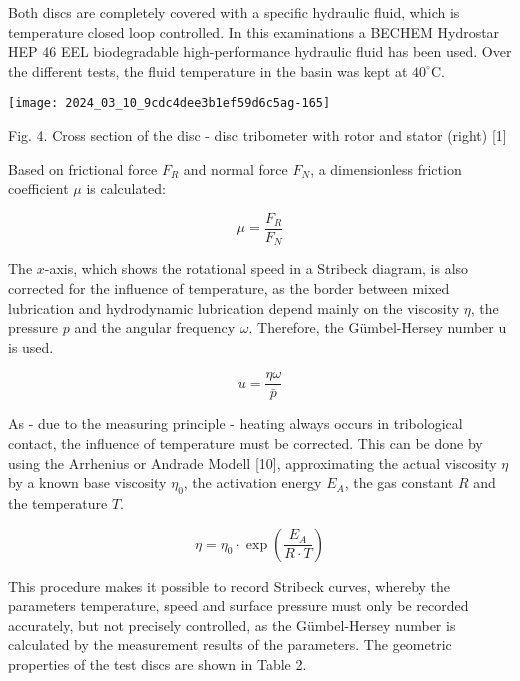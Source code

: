 \documentclass[10pt]{article}
\begin{document}
Both discs are completely covered with a specific hydraulic fluid, which is temperature closed loop controlled. In this examinations a BECHEM Hydrostar HEP 46 EEL biodegradable high-performance hydraulic fluid has been used. Over the different tests, the fluid temperature in the basin was kept at $40^{\circ} \mathrm{C}$.

\begin{center}
\texttt{[image: 2024\_03\_10\_9cdc4dee3b1ef59d6c5ag-165]}
\end{center}

Fig. 4. Cross section of the disc - disc tribometer with rotor and stator (right) [1]

Based on frictional force $F_{R}$ and normal force $F_{N}$, a dimensionless friction coefficient $\mu$ is calculated:


\begin{equation*}
\mu=\frac{F_{R}}{F_{N}} \tag{1}
\end{equation*}


The $x$-axis, which shows the rotational speed in a Stribeck diagram, is also corrected for the influence of temperature, as the border between mixed lubrication and hydrodynamic lubrication depend mainly on the viscosity $\eta$, the pressure $p$ and the angular frequency $\omega$. Therefore, the Gümbel-Hersey number $\mathrm{u}$ is used.


\begin{equation*}
u=\frac{\eta \omega}{\bar{p}} \tag{2}
\end{equation*}


As - due to the measuring principle - heating always occurs in tribological contact, the influence of temperature must be corrected. This can be done by using the Arrhenius or Andrade Modell [10], approximating the actual viscosity $\eta$ by a known base viscosity $\eta_{0}$, the activation energy $E_{A}$, the gas constant $R$ and the temperature $T$.


\begin{equation*}
\eta=\eta_{0} \cdot \exp \left(\frac{E_{A}}{R \cdot T}\right) \tag{3}
\end{equation*}


This procedure makes it possible to record Stribeck curves, whereby the parameters temperature, speed and surface pressure must only be recorded accurately, but not precisely controlled, as the Gümbel-Hersey number is calculated by the measurement results of the parameters. The geometric properties of the test discs are shown in Table 2.
\end{document}
